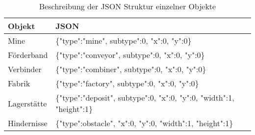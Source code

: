 \begin{table}[htp]
	\begin{center}
		\begin{tabular}{ | l | l | } 
			\hline
			\textbf{Objekt}& \textbf{JSON}\\  \hline
			Mine & \{"type":"mine", \dq{}subtype":0, "x":0, "y":0\}\\ \hline
			Förderband & \{"type":"conveyor", \dq{}subtype":0, "x":0, "y":0\} \\ \hline
			Verbinder & \{"type":"combiner", \dq{}subtype":0, "x":0, "y":0\} \\ \hline
			Fabrik & \{"type":"factory", \dq{}subtype":0, "x":0, "y":0\}\\ \hline
			Lagerstätte & \{"type":"deposit", \dq{}subtype":0, "x":0, "y":0, "width":1, "height":1\}  \\ \hline
			Hindernisse & \{"type":\dq{}obstacle", "x":0, "y":0, "width":1, "height":1\}\\\hline
		\end{tabular}
		
		\caption{Beschreibung der JSON Struktur einzelner Objekte }\label{tab:json}
	\end{center}
\end{table}



